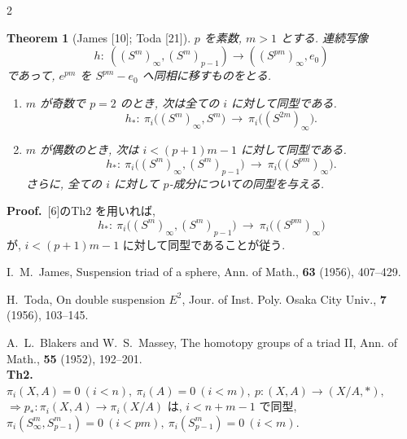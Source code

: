 \documentclass[10pt, leqno]{ltjsarticle} %
\newcommand{\pis}[2]{\pi_{#1}(#2)}       %
\numberwithin{equation}{section}
\theoremstyle{plain}
\newtheorem{theorem}{Theorem}[section]
\theoremstyle{definition}
\theoremstyle{remark}
\begin{document}
\begin{paracol}{2}

\begin{theorem}[James {[10]}; Toda {[21]}]\label{thm:2.4}
$p$ を素数, $m>1$ とする. 
連続写像
\[
h:\ ((S^m)_\infty,(S^m)_{p-1})\longrightarrow ((S^{pm})_\infty,e_0)
\]
であって, $e^{pm}$ を $S^{pm}-e_0$ へ同相に移すものをとる. 
\begin{enumerate}
\item $m$ が奇数で $p=2$ のとき, 次は全ての $i$ に対して同型である. 
\[
h_*:\ \pi_i\bigl((S^m)_\infty,S^m\bigr)\ \longrightarrow\ 
\pi_i\bigl((S^{2m})_\infty\bigr).
\]
\item $m$ が偶数のとき, 次は $i<(p+1)m-1$ に対して同型である.
\[
h_*:\ \pi_i\bigl((S^m)_\infty,(S^m)_{p-1}\bigr)\ \longrightarrow\ 
\pi_i\bigl((S^{pm})_\infty\bigr).
\]
さらに, 全ての $i$ に対して $p$-成分についての同型を与える. 
\end{enumerate}
\end{theorem}

\noindent
\textbf{Proof.}\
[6]のTh2 を用いれば, 
\[
h_*:\ \pi_i\bigl((S^m)_\infty,(S^m)_{p-1}\bigr)\ \longrightarrow\ \pi_i\bigl((S^{pm})_\infty\bigr)
\]
が, $i<(p+1)m-1$ に対して同型であることが従う. 

\switchcolumn

\noindent
\cite{James1956}
I.~M.~James,
\newblock Suspension triad of a sphere,
\newblock Ann. of Math., {\bf 63} (1956), 407--429.

\noindent
\cite{Toda1956}
H.~Toda,
\newblock On double suspension $E^2$,
\newblock Jour. of Inst. Poly. Osaka City Univ., {\bf 7} (1956), 103--145.

\noindent
\cite{BlakersMassey1952}
A.~L.~Blakers and W.~S.~Massey,
\newblock The homotopy groups of a triad II,
\newblock Ann. of Math., {\bf 55} (1952), 192--201.\\
\textbf{Th2.}\ \(\pi_i(X,A)=0\ (i<n),\ \pi_i(A)=0\ (i<m),\ 
p:(X,A)\to(X/A,*),\)\\
\(\Longrightarrow p_*:\pis{i}{X,A}\to\pis{i}{X/A}\)
は, \(i<n+m-1\) で同型, \\
\(\pis{i}{S^m_\infty, S^m_{p-1}}=0\ (i<pm),\ 
\pis{i}{S^m_{p-1}} = 0\ (i<m).\)


\end{paracol}
\end{document}
